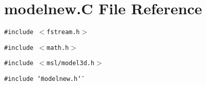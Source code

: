 \section{modelnew.C File Reference}
\label{modelnew_8C}
{\tt \#include $<$fstream.h$>$}\par
{\tt \#include $<$math.h$>$}\par
{\tt \#include $<$msl/model3d.h$>$}\par
{\tt \#include \char`\"{}modelnew.h\char`\"{}}\par
